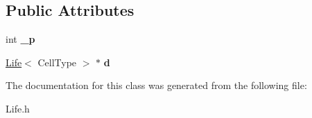 \subsection*{Public Attributes}
\begin{DoxyCompactItemize}
\item 
\hypertarget{classLife__Iterator_a78be6d8aa88e150bcec6b2d37ce477fe}{int {\bfseries \-\_\-p}}\label{classLife__Iterator_a78be6d8aa88e150bcec6b2d37ce477fe}

\item 
\hypertarget{classLife__Iterator_adcfcecd7ab3886cda6b1389691ad0b1b}{\hyperlink{classLife}{Life}$<$ Cell\-Type $>$ $\ast$ {\bfseries d}}\label{classLife__Iterator_adcfcecd7ab3886cda6b1389691ad0b1b}

\end{DoxyCompactItemize}


The documentation for this class was generated from the following file\-:\begin{DoxyCompactItemize}
\item 
Life.\-h\end{DoxyCompactItemize}

